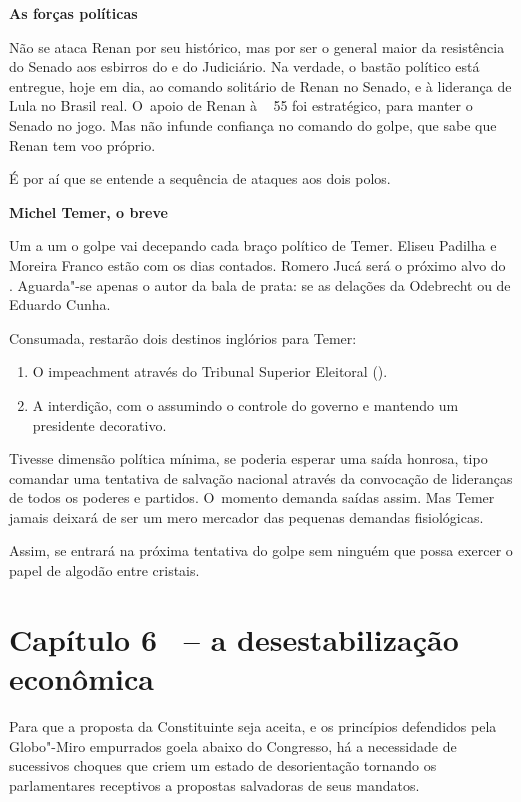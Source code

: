\textbf{As forças políticas}

Não se ataca Renan por seu histórico, mas por ser o general maior da
resistência do Senado aos esbirros do  e do Judiciário. Na verdade, o
bastão político está entregue, hoje em dia, ao comando solitário de
Renan no Senado, e à liderança de Lula no Brasil real. O~apoio de Renan
à ~ 55 foi estratégico, para manter o Senado no jogo. Mas não infunde
confiança no comando do golpe, que sabe que Renan tem voo próprio.

É por aí que se entende a sequência de ataques aos dois polos.

\textbf{Michel Temer, o breve}

Um a um o golpe vai decepando cada braço político de Temer. Eliseu
Padilha e Moreira Franco estão com os dias contados. Romero Jucá será o
próximo alvo do . Aguarda"-se apenas o autor da bala de prata: se as
delações da Odebrecht ou de Eduardo Cunha.

Consumada, restarão dois destinos inglórios para Temer:

\begin{enumerate}
\itemsep1pt\parskip0pt
\item
  O impeachment através do Tribunal Superior Eleitoral ().
\item
  A interdição, com o  assumindo o controle do governo e mantendo um
  presidente decorativo.
\end{enumerate}

Tivesse dimensão política mínima, se poderia esperar uma saída honrosa,
tipo comandar uma tentativa de salvação nacional através da convocação
de lideranças de todos os poderes e partidos. O~momento demanda saídas
assim. Mas Temer jamais deixará de ser um mero mercador das pequenas
demandas fisiológicas.

Assim, se entrará na próxima tentativa do golpe sem ninguém que possa
exercer o papel de algodão entre cristais.

\section{Capítulo 6 ~-- a desestabilização econômica}

Para que a proposta da Constituinte seja aceita, e os princípios
defendidos pela Globo"-Miro empurrados goela abaixo do Congresso, há a
necessidade de sucessivos choques que criem um estado de desorientação
tornando os parlamentares receptivos a propostas salvadoras de seus
mandatos.


